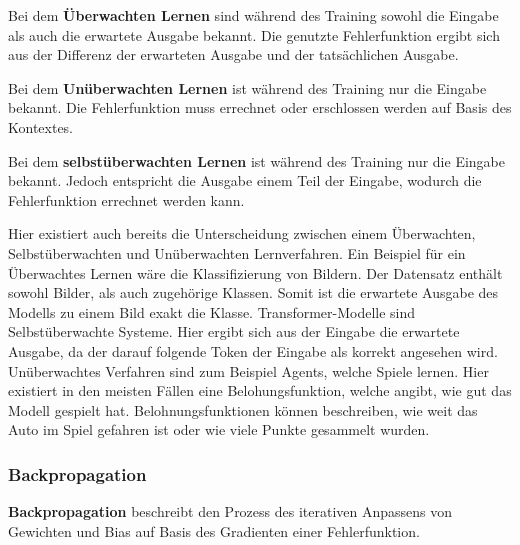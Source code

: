 \begin{definition}\label{def:ueberwachtes-lernen}
    Bei dem \textbf{Überwachten Lernen} sind während des Training sowohl die Eingabe als auch die erwartete Ausgabe bekannt.
    Die genutzte Fehlerfunktion ergibt sich aus der Differenz der erwarteten Ausgabe und der tatsächlichen Ausgabe.
\end{definition}

\begin{definition}\label{def:unueberwachtes-lernen}
    Bei dem \textbf{Unüberwachten Lernen} ist während des Training nur die Eingabe bekannt.
    Die Fehlerfunktion muss errechnet oder erschlossen werden auf Basis des Kontextes.
\end{definition}

\begin{definition}\label{def:selbstüberwachtes-lernen}
    Bei dem \textbf{selbstüberwachten Lernen} ist während des Training nur die Eingabe bekannt.
    Jedoch entspricht die Ausgabe einem Teil der Eingabe, wodurch die Fehlerfunktion errechnet werden kann.
\end{definition}

Hier existiert auch bereits die Unterscheidung zwischen einem Überwachten, Selbstüberwachten und Unüberwachten Lernverfahren.
Ein Beispiel für ein Überwachtes Lernen wäre die Klassifizierung von Bildern.
Der Datensatz enthält sowohl Bilder, als auch zugehörige Klassen.
Somit ist die erwartete Ausgabe des Modells zu einem Bild exakt die Klasse.
Transformer-Modelle sind Selbstüberwachte Systeme.
Hier ergibt sich aus der Eingabe die erwartete Ausgabe, da der darauf folgende Token der Eingabe als korrekt angesehen wird.
Unüberwachtes Verfahren sind zum Beispiel Agents, welche Spiele lernen.
Hier existiert in den meisten Fällen eine Belohungsfunktion, welche angibt, wie gut das Modell gespielt hat.
Belohnungsfunktionen können beschreiben, wie weit das Auto im Spiel gefahren ist oder wie viele Punkte gesammelt wurden.\\

\subsubsection{Backpropagation}
\begin{definition}\label{def:backpropagation}
    \textbf{Backpropagation} beschreibt den Prozess des iterativen Anpassens von Gewichten und Bias auf Basis des Gradienten einer Fehlerfunktion.
\end{definition}

